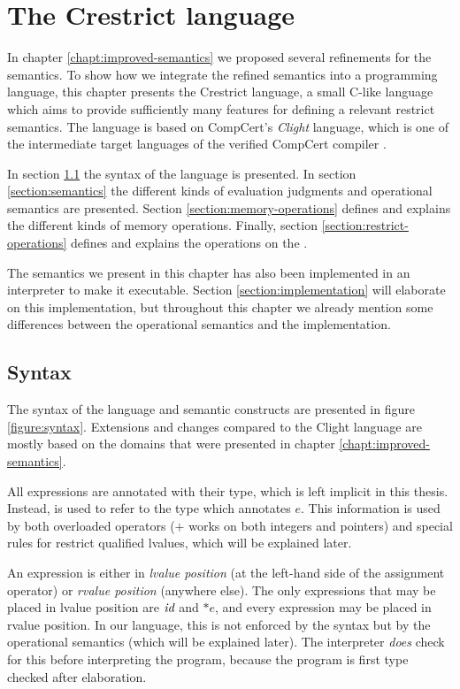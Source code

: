 \chapter{The Crestrict language}\label{chapter:crestrict}
In chapter \ref{chapt:improved-semantics} we proposed several refinements for the \cink{} semantics.
To show how we integrate the refined semantics into a programming language,
this chapter presents the Crestrict language, a small C-like language which aims to
provide sufficiently many features for defining a relevant restrict semantics.
The language is based on CompCert's \textit{Clight} language,
which is one of the intermediate target languages of the verified CompCert compiler \cite{blazy2009mechanized}.

In section \ref{section:syntax} the syntax of the language is presented. 
In section \ref{section:semantics} the different kinds of evaluation judgments and operational semantics are presented. 
Section \ref{section:memory-operations} defines and explains the different kinds of memory operations.
Finally, section \ref{section:restrict-operations} defines and explains the operations on the \Restrictstack.

The semantics we present in this chapter has also been implemented in an interpreter to make it executable.
Section \ref{section:implementation} will elaborate on this implementation, but throughout this chapter we already mention some differences between the
operational semantics and the implementation.  

\section{Syntax}\label{section:syntax}
The syntax of the language and semantic constructs are presented in figure \ref{figure:syntax}.
Extensions and changes compared to the Clight language are mostly based on the domains that were presented in chapter \ref{chapt:improved-semantics}. 

All expressions are annotated with their type, which is left implicit in this thesis.
Instead,  is used to refer to the type which annotates $e$.
This information is used by both overloaded operators (\eg $+$ works on both integers and pointers) and
special rules for restrict qualified lvalues, which will be explained later.

An expression is either in \textit{lvalue position} (at the left-hand side of the assignment operator) or \textit{rvalue position} (anywhere else).
The only expressions that may be placed in lvalue position are $\textit{id}$ and $*e$, and every expression may be placed in rvalue position.
In our language, this is not enforced by the syntax but by the operational semantics (which will be explained later).
The interpreter \textit{does} check for this before interpreting the program, because the program is first type checked after elaboration.


